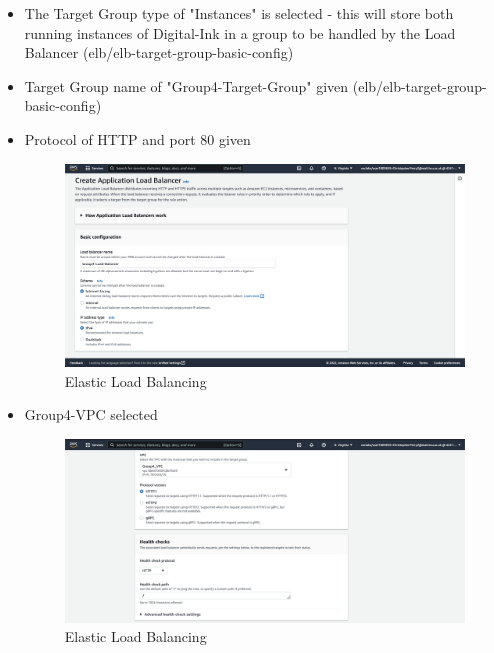 \begin{itemize}
    \item The Target Group type of "Instances" is selected - this will store both running instances of Digital-Ink in a group
    to be handled by the Load Balancer (elb/elb-target-group-basic-config)
    \item Target Group name of "Group4-Target-Group" given (elb/elb-target-group-basic-config)
    \item Protocol of HTTP and port 80 given \begin{figure}[!htbp]
                                                 \centering
                                                 \includegraphics[width=\textwidth]{resources/elb/elb-basic-config.png}
                                                 \caption{Elastic Load Balancing}
                                                 \label{fig:elb-basic-config}
                                            \end{figure}
    \item Group4-VPC selected \begin{figure}[!htbp]
                                  \centering
                                  \includegraphics[width=\textwidth]{resources/elb/elb-vpc.png}
                                  \caption{Elastic Load Balancing}

\end{figure}
\end{itemize}
